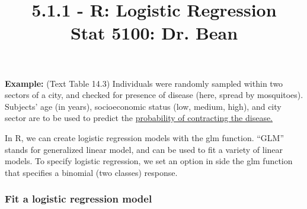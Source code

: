 \documentclass{article}\usepackage[]{graphicx}\usepackage[]{color}
\begin{document}
\title{%
  5.1.1 - R: Logistic Regression \\
  \smallskip
  \large Stat 5100: Dr. Bean
}
\date{}

\maketitle

\textbf{Example:} (Text Table 14.3)  Individuals were randomly sampled within two sectors of a city, and checked for presence of disease (here, spread by mosquitoes).  Subjects’ age (in years), socioeconomic status (low, medium, high), and city sector are to be used to predict the \underline{probability of contracting the disease.}

In R, we can create logistic regression models with the glm function. ``GLM'' stands for generalized linear model, and can be used to fit a variety of linear models. To specify logistic regression, we set an option in side the glm function that specifies a binomial (two classes) response.

\subsubsection*{Fit a logistic regression model}
\end{document}
